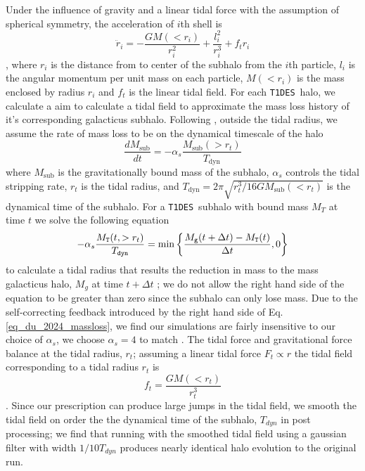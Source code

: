 \documentclass[%
 reprint,
 amsmath,
 amssymb,
 aps,
]{revtex4-2}
\def\tides{{\tt T1DES}~}
\newcommand{\refeq}[1]{Eq. \ref{#1}}
\begin{document}
  Under the influence of gravity and a linear tidal force with the assumption of spherical symmetry, the acceleration of $i$th shell is 
 \begin{equation}\label{eq_dynamics}
     \ddot{r}_{i} = - \frac{G M(< r_i)}{r_i^2} + \frac{l_i^2}{r_i^3} + f_t r_i
 \end{equation}, 
 where $r_i$ is the distance from to center of the subhalo from the $i$th particle, $l_i$ is the angular momentum per unit mass on each particle, $M (< r_i)$ is the mass enclosed by radius $r_i$ and $f_t$ is the linear tidal field.  
 For each \tides halo, we calculate a aim to calculate a tidal field to approximate the mass loss history of it's corresponding galacticus subhalo.
 Following \cite{du2024tidal}, outside the tidal radius, we assume the rate of mass loss to be on the dynamical timescale of the halo   
\begin{equation}\label{eq_du_2024_massloss}
 \frac{dM_{\text{sub}}}{dt} = - \alpha_s \frac{M_{\text{sub}}(> r_t)}{T_{\text{dyn}}}				
\end{equation} 
where $M_{\text{sub}}$ is the gravitationally bound mass of the subhalo, $\alpha_s$ controls the tidal stripping rate, $r_t$ is the tidal radius, and $T_{\text{dyn}} = 2\pi\sqrt{r_t^3 / 16GM_{\text{sub}}(<r_t)}$ is the dynamical time of the subhalo.
For a \tides subhalo with bound mass $M_{T}$ at time $t$ we solve the following equation 
\begin{equation}\label{eq_du_2024_rt}
        -\alpha_s \frac{M_{\tt T}(t, > r_t)}{T_{\tt dyn}} = \min \left \{ \frac{M_{\tt g}(t + \Delta t) - M_{\tt T}(t)}{\Delta t}, 0 \right\}
\end{equation} 
to calculate a tidal radius that results the reduction in mass to the mass galacticus halo, $M_{g}$ at time $t + \Delta t$
; we do not allow the right hand side of the equation to be greater than zero since the subhalo can only lose mass.
Due to the self-correcting feedback introduced by the right hand side of \refeq{eq_du_2024_massloss}, we find our simulations are fairly insensitive to our choice of $\alpha_s$, we choose $\alpha_s = 4$ to match \cite{du2024tidal}. 
The tidal force and gravitational force balance at the tidal radius, $r_t$; assuming a linear tidal force $F_t \propto r$ the tidal field corresponding to a tidal radius $r_t$ is 
\begin{equation}\label{tidal_field}
 f_t = \frac{G M(< r_t)}{r_t^3} 
\end{equation}.
Since our prescription can produce large jumps in the tidal field, we smooth the tidal field on order the the dynamical time of the subhalo, $T_{dyn}$ in post processing; we find that running with the smoothed tidal field using a gaussian filter with width $1/10 T_{dyn}$ produces nearly identical halo evolution to the original run.
\end{document}
